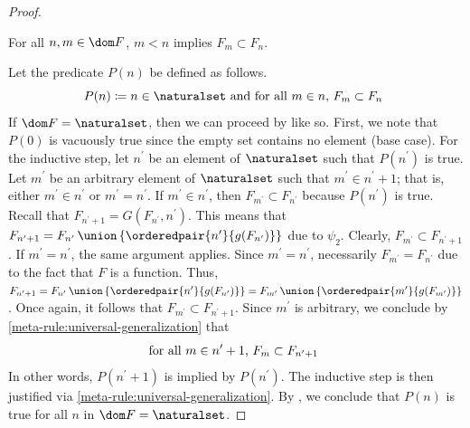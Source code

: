 \begin{proof}
    \begin{claim}
         \label{claim:if-n-less-than-m-then-F-n-is-proper-subset-of-F-m}
        For all \( n, m \in \dom F \), \( m < n \) implies \( F_{m} \subset F_{n} \).
    \end{claim}
    \noindent
    Let the predicate \( P(n) \) be defined as follows.
    \begin{equation*}
        P(n) \coloneq n \in \naturalset \ \text{and for all \( m \in n \), \( F_{m} \subset F_{n} \) }
    \end{equation*}
    If \( \dom F = \naturalset \), then we can proceed by  like so.
    First, we note that \( P(0) \) is vacuously true since the empty set contains no element (base case).
    For the inductive step, let \( n^{\prime} \) be an element of \( \naturalset \) such that \( P(n^{\prime}) \) is true.
    Let \( m^{\prime} \) be an arbitrary element of \( \naturalset \) such that \( m^{\prime} \in n^{\prime} + 1 \);
    that is, either \( m^{\prime} \in n^{\prime} \) or \( m^{\prime} = n^{\prime} \).
    If \( m^{\prime} \in n^{\prime} \), then \( F_{m^{\prime}} \subset F_{n^{\prime}} \) because \( P(n^{\prime}) \) is true.
    Recall that \( F_{n^{\prime} + 1} = G(F_{n^{\prime}}, n^{\prime}) \).
    This means that \( F_{n^{\prime} + 1} = F_{n^{\prime}} \,{\union}\, \mleft\{ \orderedpair{n^{\prime}}{g(F_{n^{\prime}})} \mright\} \) due to
    \( \psi_{2} \).
    Clearly, \( F_{m^{\prime}} \subset F_{n^{\prime} + 1} \).
    If \( m^{\prime} = n^{\prime} \), the same argument applies.
    Since \( m^{\prime} = n^{\prime} \), necessarily \( F_{m^{\prime}} = F_{n^{\prime}} \) due to the fact that \( F \) is a function.
    Thus, \( F_{n^{\prime} + 1} = F_{n^{\prime}} \,{\union}\, \mleft\{ \orderedpair{n^{\prime}}{g(F_{n^{\prime}})} \mright\} = F_{m^{\prime}} \,{\union}\,
    \mleft\{ \orderedpair{m^{\prime}}{g(F_{m^{\prime}})} \mright\} \).
    Once again, it follows that \( F_{m^{\prime}} \subset F_{n^{\prime} + 1} \).
    Since \( m^{\prime} \) is arbitrary, we conclude by \cref{meta-rule:universal-generalization} that
    \begin{equation*}
        \text{for all \( m \in n^{\prime} + 1 \), \( F_{m} \subset F_{n^{\prime} + 1} \) }
    \end{equation*}
    In other words, \( P(n^{\prime} + 1) \) is implied by \( P(n^{\prime}) \).
    The inductive step is then justified via \cref{meta-rule:universal-generalization}.
    By , we conclude that \( P(n) \) is true for all \( n \) in \( \dom F = \naturalset \).


\end{proof}
